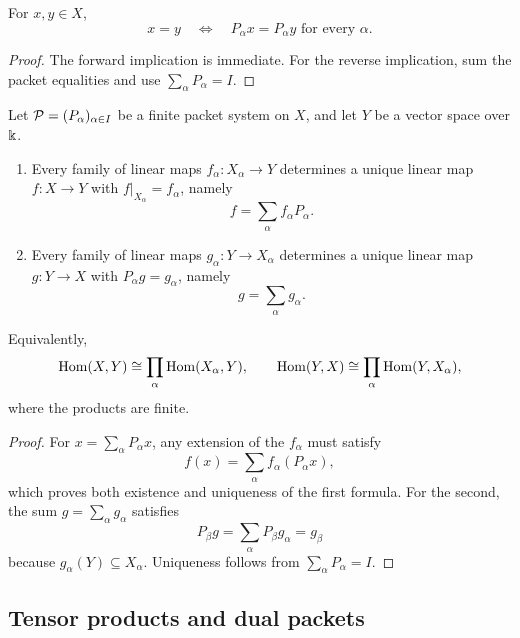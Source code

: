 \begin{corollary}
\label{cor:packetwise-equality}
For $x,y\in X$,
\[
x=y
\quad\Longleftrightarrow\quad
P_\alpha x=P_\alpha y\text{ for every }\alpha.
\]
\end{corollary}

\begin{proof}
The forward implication is immediate.  For the reverse implication, sum the packet equalities and use $\sum_\alpha P_\alpha=I$.
\end{proof}



\begin{corollary}
\label{cor:packet-universal-property}
Let \(\mathcal P=(P_\alpha)_{\alpha\in I}\) be a finite packet system on \(X\), and let \(Y\) be a vector space over \(\Bbbk\).
\begin{enumerate}
\item Every family of linear maps \(f_\alpha:X_\alpha\to Y\) determines a unique linear map \(f:X\to Y\) with \(f|_{X_\alpha}=f_\alpha\), namely
\[
f=\sum_\alpha f_\alpha P_\alpha.
\]
\item Every family of linear maps \(g_\alpha:Y\to X_\alpha\) determines a unique linear map \(g:Y\to X\) with \(P_\alpha g=g_\alpha\), namely
\[
g=\sum_\alpha g_\alpha.
\]
\end{enumerate}
Equivalently,
\[
\operatorname{Hom}(X,Y)\cong\prod_\alpha\operatorname{Hom}(X_\alpha,Y),
\qquad
\operatorname{Hom}(Y,X)\cong\prod_\alpha\operatorname{Hom}(Y,X_\alpha),
\]
where the products are finite.
\end{corollary}

\begin{proof}
For \(x=\sum_\alpha P_\alpha x\), any extension of the \(f_\alpha\) must satisfy
\[
f(x)=\sum_\alpha f_\alpha(P_\alpha x),
\]
which proves both existence and uniqueness of the first formula.  For the second, the sum \(g=\sum_\alpha g_\alpha\) satisfies
\[
P_\beta g
=\sum_\alpha P_\beta g_\alpha
=g_\beta
\]
because \(g_\alpha(Y)\subseteq X_\alpha\).  Uniqueness follows from \(\sum_\alpha P_\alpha=I\).
\end{proof}


\subsection{Tensor products and dual packets}

